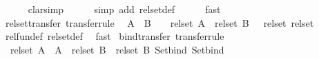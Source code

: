 \begin{isabellebody}
\ \ \ \ \isamarkupfalse%
\ clarsimp\isanewline
\ \ \ \ \isamarkupfalse%
\ {\isacharparenleft}{\kern0pt}simp\ add{\isacharcolon}{\kern0pt}\ rel{\isacharunderscore}{\kern0pt}set{\isacharunderscore}{\kern0pt}def{\isacharparenright}{\kern0pt}\isanewline
\ \ \ \ \isamarkupfalse%
\ fast\isanewline
\ \ \ \ \isamarkupfalse%
\isanewline
\ \ \isamarkupfalse%
%
\endisatagproof
{\isafoldproof}%
%
\isadelimproof
\isanewline
%
\endisadelimproof
\isanewline
{}\isamarkupfalse%
\ rel{\isacharunderscore}{\kern0pt}set{\isacharunderscore}{\kern0pt}transfer\ {\isacharbrackleft}{\kern0pt}transfer{\isacharunderscore}{\kern0pt}rule{\isacharbrackright}{\kern0pt}{\isacharcolon}{\kern0pt}\isanewline
\ \ {\isachardoublequoteopen}{\isacharparenleft}{\kern0pt}{\isacharparenleft}{\kern0pt}A\ {\isacharequal}{\kern0pt}{\isacharequal}{\kern0pt}{\isacharequal}{\kern0pt}{\isachargreater}{\kern0pt}\ B\ {\isacharequal}{\kern0pt}{\isacharequal}{\kern0pt}{\isacharequal}{\kern0pt}{\isachargreater}{\kern0pt}\ {\isacharparenleft}{\kern0pt}{\isacharequal}{\kern0pt}{\isacharparenright}{\kern0pt}{\isacharparenright}{\kern0pt}\ {\isacharequal}{\kern0pt}{\isacharequal}{\kern0pt}{\isacharequal}{\kern0pt}{\isachargreater}{\kern0pt}\ rel{\isacharunderscore}{\kern0pt}set\ A\ {\isacharequal}{\kern0pt}{\isacharequal}{\kern0pt}{\isacharequal}{\kern0pt}{\isachargreater}{\kern0pt}\ rel{\isacharunderscore}{\kern0pt}set\ B\ {\isacharequal}{\kern0pt}{\isacharequal}{\kern0pt}{\isacharequal}{\kern0pt}{\isachargreater}{\kern0pt}\ {\isacharparenleft}{\kern0pt}{\isacharequal}{\kern0pt}{\isacharparenright}{\kern0pt}{\isacharparenright}{\kern0pt}\ rel{\isacharunderscore}{\kern0pt}set\ rel{\isacharunderscore}{\kern0pt}set{\isachardoublequoteclose}\isanewline
%
\isadelimproof
\ \ %
\endisadelimproof
%
\isatagproof
{}\isamarkupfalse%
\ rel{\isacharunderscore}{\kern0pt}fun{\isacharunderscore}{\kern0pt}def\ rel{\isacharunderscore}{\kern0pt}set{\isacharunderscore}{\kern0pt}def\ \isamarkupfalse%
\ fast%
\endisatagproof
{\isafoldproof}%
%
\isadelimproof
\isanewline
%
\endisadelimproof
\isanewline
{}\isamarkupfalse%
\ bind{\isacharunderscore}{\kern0pt}transfer\ {\isacharbrackleft}{\kern0pt}transfer{\isacharunderscore}{\kern0pt}rule{\isacharbrackright}{\kern0pt}{\isacharcolon}{\kern0pt}\isanewline
\ \ {\isachardoublequoteopen}{\isacharparenleft}{\kern0pt}rel{\isacharunderscore}{\kern0pt}set\ A\ {\isacharequal}{\kern0pt}{\isacharequal}{\kern0pt}{\isacharequal}{\kern0pt}{\isachargreater}{\kern0pt}\ {\isacharparenleft}{\kern0pt}A\ {\isacharequal}{\kern0pt}{\isacharequal}{\kern0pt}{\isacharequal}{\kern0pt}{\isachargreater}{\kern0pt}\ rel{\isacharunderscore}{\kern0pt}set\ B{\isacharparenright}{\kern0pt}\ {\isacharequal}{\kern0pt}{\isacharequal}{\kern0pt}{\isacharequal}{\kern0pt}{\isachargreater}{\kern0pt}\ rel{\isacharunderscore}{\kern0pt}set\ B{\isacharparenright}{\kern0pt}\ Set{\isachardot}{\kern0pt}bind\ Set{\isachardot}{\kern0pt}bind{\isachardoublequoteclose}\isanewline

\end{isabellebody}
